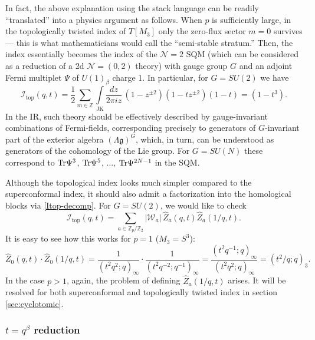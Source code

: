 \documentclass[hyper,letterpaper]{JHEP3}
\newcommand{\Z}{{\mathbb Z}}
\def\frak{\mathfrak}
\renewcommand{\hat}{\widehat}
\def\CI{{\mathcal I}}
\def\CN{{\mathcal N}}
\def\CW{{\mathcal W}}
\newcommand{\Tr}{{\rm Tr}}
\begin{document}
In fact, the above explanation using the stack language can be readily ``translated'' into a physics argument as follows. When $p$ is sufficiently large, in the topologically twisted index of $T[M_3]$ only
the zero-flux sector $m=0$ survives --- this is what mathematicians would call the ``semi-stable stratum.'' Then, the index essentially becomes the
index of the $\CN=2$ SQM (which can be considered as a reduction of a 2d $\CN=(0,2)$ theory) with gauge group $G$ and an adjoint Fermi multiplet
$\Psi$ of $U(1)_{\beta}$ charge 1. In particular, for $G=SU(2)$ we have
\begin{equation}
	\CI_\text{top}(q,t)=\frac{1}{2}\sum_{m\in \Z}\int\limits_\text{JK} \frac{dz}{2\pi i z}
	\,(1-z^{\pm2})(1-tz^{\pm 2})(1-t)=(1-t^3).
	\label{Itop-Lp1-SU2}
\end{equation}
In the IR, such theory should be effectively described by gauge-invariant combinations of Fermi-fields, corresponding precisely to generators of $G$-invariant part of the exterior algebra $(\Lambda\frak{g})^G$, which,
in turn, can be understood as generators of the cohomology of the Lie group.
For $G=SU(N)$ these correspond to $\Tr\Psi^3$, $\Tr\Psi^5$, ..., $\Tr\Psi^{2N-1}$ in the SQM.

Although the topological index looks much simpler compared to the superconformal index, it should also admit a factorization into the homological blocks via \eqref{Itop-decomp}. For $G=SU(2)$, we would like to check
\begin{equation}
		\CI_\text{top}(q,t)=\sum_{a\in \Z_p/\Z_2}
		|\CW_a|\,\hat{Z}_a(q,t)\hat{Z}_a(1/q,t).
		\label{Itop-factorization}
\end{equation}
It is easy to see how this works for $p=1$ ($M_3=S^3$):
\begin{equation}
	\hat{Z}_0(q,t)\cdot\hat{Z}_0(1/q,t)=
	\frac{1}{(t^2q^2;q)_\infty}\cdot\frac{1}{(t^2q^{-2};q^{-1})_\infty}=
	\frac{(t^2q^{-1};q)_\infty}{(t^2q^2;q)_\infty}=(t^2/q;q)_3.
\end{equation}
In the case $p>1$, again, the problem of defining $\hat{Z}_a(1/q,t)$ arises. It will be resolved for both superconformal and topologically twisted index in section \ref{sec:cyclotomic}.


\subsubsection{${t=q^\beta}$ reduction}
\label{sec:beta-reduction}
\end{document}
